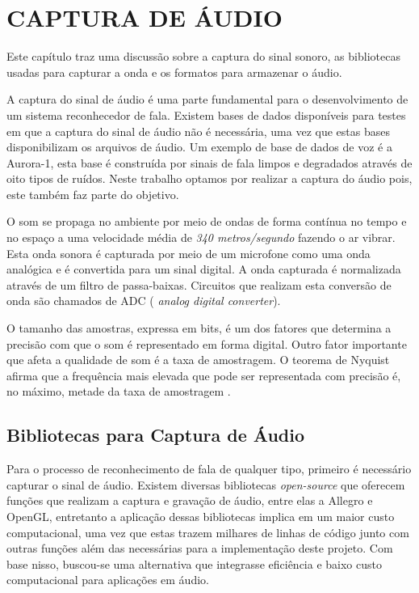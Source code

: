 \chapter{CAPTURA DE ÁUDIO}
\label{chap:cap_audio}
\thispagestyle{plain}
Este capítulo traz uma discussão sobre a captura do sinal sonoro, as bibliotecas usadas para capturar a onda e os formatos para armazenar o áudio.

\quad A captura do sinal de áudio é uma parte fundamental para o desenvolvimento de um sistema reconhecedor de fala. Existem bases de dados disponíveis para testes em que a captura
do sinal de áudio não é necessária, uma vez que estas bases disponibilizam os arquivos de áudio. Um exemplo de base de dados de voz é a Aurora-1, esta base é construída por sinais de fala   limpos e degradados através de oito tipos de ruídos. Neste trabalho optamos por realizar a captura do áudio pois, este também faz parte do objetivo.

\quad O som se propaga no ambiente por meio de ondas de forma contínua no tempo e no espaço a uma velocidade média de \textit{340 metros/segundo} fazendo o ar vibrar. Esta onda sonora  é capturada por meio de um microfone como uma onda analógica e  é convertida para um sinal digital. A onda capturada é normalizada através de um filtro de passa-baixas. Circuitos que realizam esta conversão de onda são chamados de  ADC (\textit{ analog digital converter}). 

\quad O tamanho das amostras, expressa em bits, é um dos fatores que determina a precisão com que o som é representado em forma digital. Outro fator importante que afeta a qualidade de som é a taxa de amostragem. O teorema de Nyquist  afirma que a frequência mais elevada que pode ser representada com precisão é, no máximo, metade da taxa de amostragem \cite{nyqui}.

\section{Bibliotecas para Captura de Áudio}
\quad Para o processo de reconhecimento de fala de qualquer tipo, primeiro é necessário capturar o sinal de áudio. Existem diversas bibliotecas \textit {open-source} que oferecem funções que realizam a captura e gravação de áudio, entre elas a Allegro e OpenGL, entretanto a aplicação dessas bibliotecas implica em um maior custo computacional, uma vez que estas trazem milhares de linhas de código junto com outras funções além das necessárias para a implementação deste projeto. Com base nisso, buscou-se uma alternativa que integrasse eficiência e baixo custo computacional para aplicações em áudio. 
 
